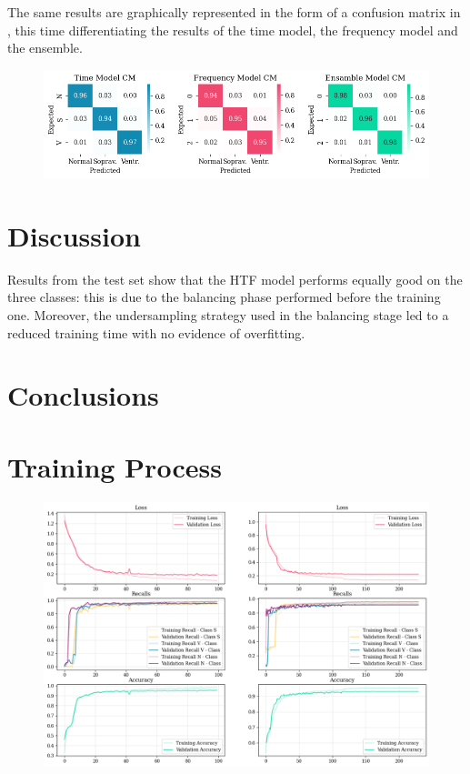 \documentclass[conference]{IEEEtran}
\begin{document}
    The same results are graphically represented in the form of a
    confusion matrix in , this time differentiating
    the results of the time model, the frequency model and the
    ensemble.

    \begin{figure}
        \centering
        \includegraphics[width=\linewidth]{img/confmatr.png}
        \caption{}
        \label{fig:confmat}
    \end{figure}

\section{Discussion}
    Results from the test set show that the HTF model performs equally good on
    the three classes: this is due to the balancing phase performed before the
    training one. Moreover, the undersampling strategy used in the balancing
    stage led to a reduced training time with no evidence of overfitting.


\section{Conclusions}



\appendices
\section{Training Process}
\begin{figure}
    \centering
    \includegraphics[width=\linewidth]{img/training.png}
    \caption{}
    \label{app:training}
\end{figure}
\end{document}
